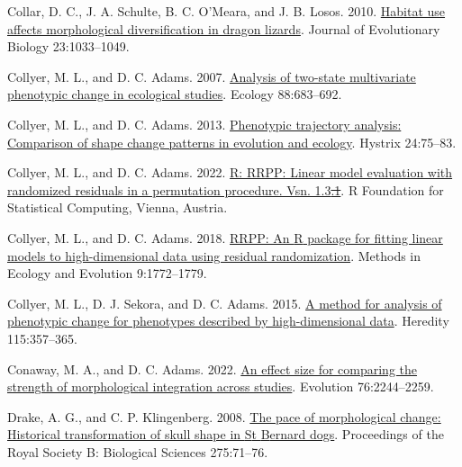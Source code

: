\documentclass[
  11pt,
]{article}
\newlength{\cslhangindent}
\newlength{\cslentryspacingunit} %
\newenvironment{CSLReferences}[2] %
 {%
  \setlength{\parindent}{0pt}
  \ifodd #1
  \let\oldpar\par
  \def\par{\hangindent=\cslhangindent\oldpar}
  \fi
  \setlength{\parskip}{#2\cslentryspacingunit}
 }%
 {}
\providecommand{\DIFaddtex}[1]{{\protect\color{blue}\uwave{#1}}} %
\providecommand{\DIFdeltex}[1]{{\protect\color{red}\sout{#1}}}                      %
\providecommand{\DIFaddbegin}{} %
\providecommand{\DIFaddend}{} %
\providecommand{\DIFdelbegin}{} %
\providecommand{\DIFdelend}{} %
\providecommand{\DIFadd}[1]{\texorpdfstring{\DIFaddtex{#1}}{#1}} %
\providecommand{\DIFdel}[1]{\texorpdfstring{\DIFdeltex{#1}}{}} %
\newcommand{\DIFscaledelfig}{0.5}
\newlength{\DIFdelgraphicswidth} %
\newlength{\DIFdelgraphicsheight} %
\newcommand{\DIFaddincludegraphics}[2][]{{\color{blue}\fbox{\DIFOincludegraphics[#1]{#2}}}} %
\newcommand{\DIFdelincludegraphics}[2][]{%
\sbox{\DIFdelgraphicsbox}{\DIFOincludegraphics[#1]{#2}}%
\settoboxwidth{\DIFdelgraphicswidth}{\DIFdelgraphicsbox} %
\settoboxtotalheight{\DIFdelgraphicsheight}{\DIFdelgraphicsbox} %
\scalebox{\DIFscaledelfig}{%
\parbox[b]{\DIFdelgraphicswidth}{\usebox{\DIFdelgraphicsbox}\\[-\baselineskip] \rule{\DIFdelgraphicswidth}{0em}}\llap{\resizebox{\DIFdelgraphicswidth}{\DIFdelgraphicsheight}{%
\setlength{\unitlength}{\DIFdelgraphicswidth}%
\begin{picture}(1,1)%
\thicklines\linethickness{2pt} %
{\color[rgb]{1,0,0}\put(0,0){\framebox(1,1){}}}%
{\color[rgb]{1,0,0}\put(0,0){\line( 1,1){1}}}%
{\color[rgb]{1,0,0}\put(0,1){\line(1,-1){1}}}%
\end{picture}%
}\hspace*{3pt}}} %
} %
\DeclareRobustCommand{\DIFaddbegin}{\DIFOaddbegin \let\includegraphics\DIFaddincludegraphics} %
\DeclareRobustCommand{\DIFaddend}{\DIFOaddend \let\includegraphics\DIFOincludegraphics} %
\DeclareRobustCommand{\DIFdelbegin}{\DIFOdelbegin \let\includegraphics\DIFdelincludegraphics} %
\DeclareRobustCommand{\DIFdelend}{\DIFOaddend \let\includegraphics\DIFOincludegraphics} %
\begin{document}
\begin{CSLReferences}{1}{0}
\leavevmode{}%
Collar, D. C., J. A. Schulte, B. C. O'Meara, and J. B. Losos. 2010.
\href{https://doi.org/10.1111/j.1420-9101.2010.01971.x}{Habitat use
affects morphological diversification in dragon lizards}. Journal of
Evolutionary Biology 23:1033--1049.

\leavevmode{}%
Collyer, M. L., and D. C. Adams. 2007.
\href{https://doi.org/10.1890/06-0727}{Analysis of two-state
multivariate phenotypic change in ecological studies}. Ecology
88:683--692.

\leavevmode{}%
Collyer, M. L., and D. C. Adams. 2013.
\href{https://doi.org/10.4404/hystrix-24.1-6298}{Phenotypic trajectory
analysis: Comparison of shape change patterns in evolution and ecology}.
Hystrix 24:75--83.

\leavevmode{}%
Collyer, M. L., and D. C. Adams. 2022.
\href{https://CRAN.R-project.org/package=RRPP}{R: RRPP: Linear model
evaluation with randomized residuals in a permutation procedure. Vsn.
1.3\DIFdelbegin \DIFdel{.1}\DIFdelend \DIFaddbegin \DIFadd{.2}\DIFaddend }. R Foundation for Statistical Computing, Vienna, Austria.

\leavevmode{}%
Collyer, M. L., and D. C. Adams. 2018.
\href{https://doi.org/10.1111/2041-210X.13029}{RRPP: An {R} package for
fitting linear models to high-dimensional data using residual
randomization}. Methods in Ecology and Evolution 9:1772--1779.

\leavevmode{}%
Collyer, M. L., D. J. Sekora, and D. C. Adams. 2015.
\href{https://doi.org/10.1038/hdy.2014.75}{A method for analysis of
phenotypic change for phenotypes described by high-dimensional data}.
Heredity 115:357--365.

\leavevmode{}%
Conaway, M. A., and D. C. Adams. 2022.
\href{https://doi.org/10.1111/evo.14595}{An effect size for comparing
the strength of morphological integration across studies}. Evolution
76:2244--2259.

\leavevmode{}%
Drake, A. G., and C. P. Klingenberg. 2008.
\href{https://doi.org/10.1098/rspb.2007.1169}{The pace of morphological
change: Historical transformation of skull shape in {S}t {B}ernard
dogs}. Proceedings of the Royal Society B: Biological Sciences
275:71--76.


\end{CSLReferences}
\end{document}
